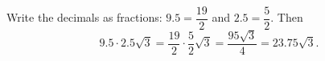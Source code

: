 Write the decimals as fractions: $9.5=\dfrac{19}{2}$ and $2.5=\dfrac{5}{2}$. Then
\[
9.5\cdot2.5\sqrt3=\dfrac{19}{2}\cdot\dfrac{5}{2}\sqrt3=\boxed{\dfrac{95\sqrt3}{4}}=23.75\sqrt3 .
\]
